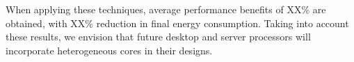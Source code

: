 When applying these techniques, average performance benefits of XX\% are obtained, with XX\% reduction in final energy consumption. Taking into account these results, we envision that future desktop and server processors will incorporate heterogeneous cores in their designs.



\fi